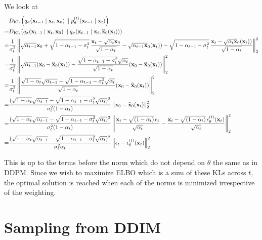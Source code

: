 We look at
\begin{align}
    & D_{\mathrm{KL}}\left( q_{\sigma}({\mathbf{x}}_{t-1} \mid {\mathbf{x}}_{t}, {\mathbf{x}}_0) \mid\mid p_{\theta}^{(t)}({\mathbf{x}}_{t-1} \mid {\mathbf{x}}_{t}) \right) \nonumber \\
    = & D_{\mathrm{KL}}\left( q_{\sigma}({\mathbf{x}}_{t-1} \mid {\mathbf{x}}_{t}, {\mathbf{x}}_0) \mid\mid q_{\sigma}({\mathbf{x}}_{t-1} \mid {\mathbf{x}}_{t}, \widehat{{\mathbf{x}}}_0({\mathbf{x}}_t)) \right)  \nonumber \\
    = & \frac{1}{\sigma_t^2} \left\lVert 
    \sqrt{\alpha_{t-1}}{\mathbf{x}}_0
    + \sqrt{1 - \alpha_{t-1} - \sigma_t^2} \, \frac{{\mathbf{x}}_t - \sqrt{\alpha_t}{\mathbf{x}}_0}{\sqrt{1-\alpha_t}} -  \sqrt{\alpha_{t-1}}\widehat{{\mathbf{x}}}_0({\mathbf{x}}_t))
    - \sqrt{1 - \alpha_{t-1} - \sigma_t^2} \, \frac{{\mathbf{x}}_t - \sqrt{\alpha_t}\widehat{{\mathbf{x}}}_0({\mathbf{x}}_t))}{\sqrt{1-\alpha_t}}
    \right\rVert_2^2 \nonumber \\
    = & \frac{1}{\sigma_t^2} \left\lVert 
    \sqrt{\alpha_{t-1}} ({\mathbf{x}}_0 - \widehat{{\mathbf{x}}}_0({\mathbf{x}}_t)) - \frac{\sqrt{1 - \alpha_{t-1} - \sigma_t^2}\sqrt{\alpha_t}}{\sqrt{1-\alpha_t}} ({\mathbf{x}}_0 - \widehat{{\mathbf{x}}}_0({\mathbf{x}}_t))
    \right\rVert_2^2    \nonumber \\
    = & \frac{1}{\sigma_t^2} \left\lVert 
    \frac{\sqrt{1-\alpha_t}\sqrt{\alpha_{t-1}} - \sqrt{1 - \alpha_{t-1} - \sigma_t^2}\sqrt{\alpha_t}}{\sqrt{1-\alpha_t}} ({\mathbf{x}}_0 - \widehat{{\mathbf{x}}}_0({\mathbf{x}}_t))    
    \right\rVert_2^2 \nonumber \\
    = & \frac{(\sqrt{1-\alpha_t}\sqrt{\alpha_{t-1}} - \sqrt{1 - \alpha_{t-1} - \sigma_t^2}\sqrt{\alpha_t})^2}{\sigma_t^2 (1-\alpha_t)} \left\lVert 
    {\mathbf{x}}_0 - \widehat{{\mathbf{x}}}_0({\mathbf{x}}_t)    
    \right\rVert_2^2 \nonumber \\
    = & \frac{(\sqrt{1-\alpha_t}\sqrt{\alpha_{t-1}} - \sqrt{1 - \alpha_{t-1} - \sigma_t^2}\sqrt{\alpha_t})^2}{\sigma_t^2 (1-\alpha_t)} \left\lVert 
    \frac{{\mathbf{x}}_t - \sqrt{(1 - \alpha_t)} \, \epsilon_t}{\sqrt{\alpha_t}} - \frac{{\mathbf{x}}_t - \sqrt{(1 - \alpha_t)} \, \epsilon^{(t)}_\theta({\mathbf{x}}_t)}{\sqrt{\alpha_t}}    
    \right\rVert_2^2 \nonumber \\
    = & \frac{(\sqrt{1-\alpha_t}\sqrt{\alpha_{t-1}} - \sqrt{1 - \alpha_{t-1} - \sigma_t^2}\sqrt{\alpha_t})^2}{\sigma_t^2 \alpha_t} \left\lVert 
    \epsilon_t - \epsilon^{(t)}_\theta({\mathbf{x}}_t)
    \right\rVert_2^2 
\end{align}

This is up to the terms before the norm which do not depend on $\theta$ the same as in DDPM.
Since we wish to maximize ELBO which is a sum of these KLs across $t$, the optimal solution is reached when each of the norms is minimized irrespective of the weighting. 


\section{Sampling from DDIM}\label{sec:ddim_sampling}

